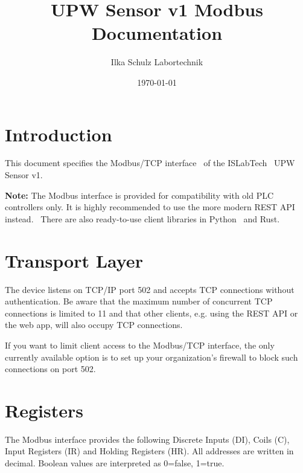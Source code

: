 \documentclass[twocolumn,11pt,a4paper]{extarticle}
\begin{document}
\title{UPW Sensor v1 Modbus Documentation}
\author{Ilka Schulz Labortechnik}
\date{\today}
\maketitle

\tableofcontents

\section{Introduction}
This document specifies the Modbus/TCP interface~\cite{Modbus} of the
ISLabTech~\cite{ISLabTech} UPW Sensor v1.~\cite{sensor}

\textbf{Note:}
The Modbus interface is provided for compatibility with old PLC controllers only.
It is highly recommended to use the more modern REST API instead.~\cite{api}
There are also ready-to-use client libraries in Python~\cite{pythonlib} and Rust.~\cite{rustlib}


\section{Transport Layer}
The device listens on TCP/IP port 502 and accepts  TCP connections without authentication.
Be aware that the maximum number of concurrent TCP connections is limited to 11
and that other clients,
e.g. using the REST API or the web app,
will also occupy TCP connections.

If you want to limit client access to the Modbus/TCP interface,
the only currently available option is to set up your organization's firewall to block such connections on port 502.


\section{Registers}
The Modbus interface provides the following Discrete Inputs (DI), Coils (C), Input Registers (IR) and Holding Registers (HR). All addresses are written in decimal. Boolean values are interpreted as 0=false, 1=true.
\end{document}
